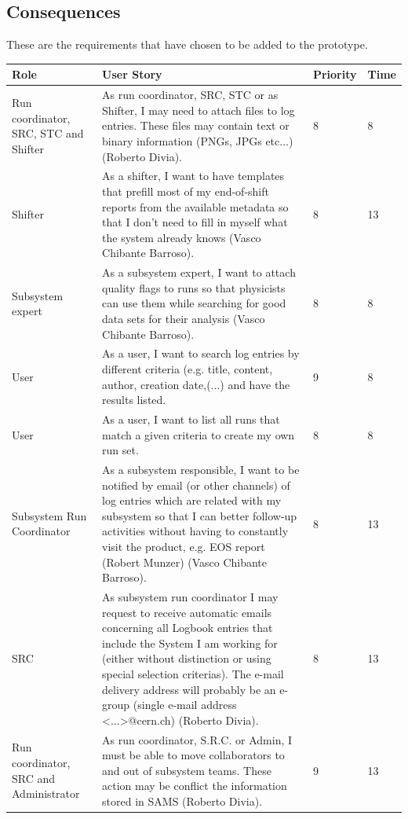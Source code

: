 \documentclass[paper=a4, fontsize=11pt,twoside]{scrartcl}	%
\begin{document}
\subsection{Consequences}
These are the requirements that have chosen to be added to the prototype. \\
\begin{longtable}{ | p{3cm} | p{8cm} | p{1cm} | l |}
\hline
Role & User Story & Priority & Time \\ \hline
Run coordinator, SRC, STC and Shifter& As run coordinator, SRC, STC or as Shifter, I may need to attach files to log entries. These files may contain text or binary information (PNGs, JPGs etc...) (Roberto Divia). & 8 & 8 \\ \hline
Shifter &  As a shifter, I want to have templates that prefill most of my end-of-shift reports from the available metadata so that I don’t need to fill in myself what the system already knows (Vasco Chibante Barroso). & 8 & 13 \\ \hline
Subsystem expert & As a subsystem expert, I want to attach quality flags to runs so that
physicists can use them while searching for good data sets for their analysis (Vasco Chibante Barroso). & 8 & 8 \\ \hline
User & As a user, I want to search log entries by different criteria (e.g. title, content, author, creation date,(...) and have the results listed. & 9 & 8 \\ \hline
User &  As a user, I want to list all runs that match a given criteria to create my own run set. & 8 & 8 \\ \hline
Subsystem Run Coordinator &  As a subsystem responsible, I want to be notified by email (or other channels) of log entries which are related with my subsystem so that I can better follow-up activities without having to constantly visit the product, e.g. EOS report (Robert Munzer) (Vasco Chibante Barroso). & 8 & 13 \\ \hline
SRC & As subsystem run coordinator I may request to receive automatic emails concerning all Logbook entries that include the System I am working for (either without distinction or using special selection criterias). The e-mail delivery address will probably be an e-group (single e-mail address <...>@cern.ch) (Roberto Divia). & 8 & 13 \\ \hline
Run coordinator, SRC and Administrator &  As run coordinator, S.R.C. or Admin, I must be able to move collaborators to and out of subsystem teams. These action may be conflict the information stored in SAMS (Roberto Divia). & 9 & 13 \\ \hline
\end{longtable}
\end{document}
